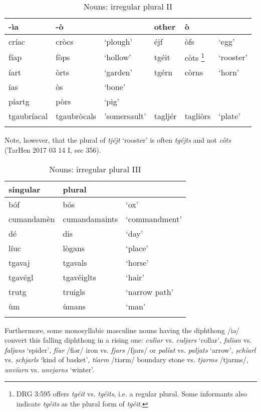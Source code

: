\begin{table}
\caption{Nouns: irregular plural II} 
\label{irregplII}
 \begin{tabular}{llllll}
  \lsptoprule
   -ìa & -ò & & other & ò & \\
  \midrule
críac & cròcs & `plough' & éjf & òfs & `egg'\\
fíap & fòps & `hollow' & tgéit & còts \footnote{DRG 3:595 offers \textit{tgéit} vs. \textit{tgéits}, i.e. a regular plural. Some informants also indicate \textit{tgéits} as the plural form of \textit{tgéit}.} & `rooster'\\
íart  & òrts & `garden' & tgérn & còrns & `horn'\\
  ías & òs & `bone' \\
píartg & pòrs & `pig'\\
tgaubríacal & tgaubròcals & 'somersault' & tagljér & tagliòrs & `plate'\\
  \lspbottomrule
 \end{tabular}
\end{table}

Note, however, that the plural of \textit{tjéjt} `rooster' is often \textit{tgéjts} and not \textit{còts} (TarHen 2017 03 14 I, sec 356).

\begin{table}
\caption{Nouns: irregular plural III}
\label{irregplIII}
 \begin{tabular}{lll}
  \lsptoprule
singular & plural \\
  \midrule
bóf & bós & `ox'\\
cumandamèn & cumandamaints & `commandment'\\
dé & dis & `day'\\
líuc  & lògans & `place'\\ %
tgavaj & tgavals & `horse'\\
tgavégl & tgavéiglts & `hair'\\ 
trutg & truigls & `narrow path'\\
ùm & ùmans & `man'\\
  \lspbottomrule
 \end{tabular}
\end{table}

Furthermore, some monosyllabic masculine nouns having the diphthong /iə/ convert this falling diphthong in a rising one: \textit{culìar} vs. \textit{culjars} `collar', \textit{falìan} vs. \textit{faljans} `spider', \textit{fíar} /fiər/ iron vs. \textit{fjars} /fjars/ or \textit{palíat} vs. \textit{paljats} `arrow', \textit{ṣchíarl} vs. \textit{ṣchjarls} `kind of basket', \textit{tíarm} /tiərm/ boundary stone vs. \textit{tjarms} /tjarms/, \textit{unvíarn} vs. \textit{unvjarns} `winter'.


